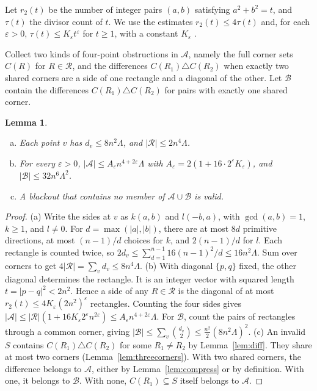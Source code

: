 \documentclass[12pt]{article}
\theoremstyle{plain}
\newtheorem{lemma}[theorem]{Lemma}
\theoremstyle{definition}
\theoremstyle{remark}
\begin{document}
Let $r_2(t)$ be the number of integer pairs $(a,b)$ satisfying
$a^2+b^2=t$, and $\tau(t)$ the divisor count of $t$.
We use the estimates $r_2(t)\le4\tau(t)$ and, for each
$\varepsilon>0$, $\tau(t)\le K_\varepsilon t^\varepsilon$ for $t\ge1$,
with a constant $K_\varepsilon$
\cite[Sections~16.9, 16.10, and~18.1]{hardywright2008}.

Collect two kinds of four-point obstructions in $\mathcal A$,
namely the full corner sets $C(R)$ for $R\in\mathcal R$, and the
differences $C(R_1)\triangle C(R_2)$ when exactly two shared corners
are a side of one rectangle and a diagonal of the other.
Let $\mathcal B$ contain the differences $C(R_1)\triangle C(R_2)$
for pairs with exactly one shared corner.

\begin{lemma}\label{lem:counts}
\leavevmode
\begin{enumerate}[(a)]
\item Each point $v$ has $d_v\le8n^2\Lambda$, and $|\mathcal R|\le2n^4\Lambda$.
\item For every $\varepsilon>0$, $|\mathcal A|\le A_\varepsilon n^{4+2\varepsilon}\Lambda$ with $A_\varepsilon=2(1+16\cdot2^\varepsilon K_\varepsilon)$, and $|\mathcal B|\le32n^6\Lambda^2$.
\item A blackout that contains no member of $\mathcal A\cup\mathcal B$ is valid.
\end{enumerate}
\end{lemma}

\begin{proof}
(a) Write the sides at $v$ as $k(a,b)$ and $l(-b,a)$, with
$\gcd(a,b)=1$, $k\ge1$, and $l\ne0$.
For $d=\max(|a|,|b|)$, there are at most $8d$ primitive directions,
at most $(n-1)/d$ choices for $k$, and $2(n-1)/d$ for $l$.
Each rectangle is counted twice, so
$2d_v\le\sum_{d=1}^{n-1}16(n-1)^2/d\le16n^2\Lambda$.
Sum over corners to get
$4|\mathcal R|=\sum_vd_v\le8n^4\Lambda$.
(b) With diagonal $\{p,q\}$ fixed, the other diagonal determines the
rectangle. It is an integer vector with squared length
$t=|p-q|^2<2n^2$. Hence a side of any $R\in\mathcal R$ is the
diagonal of at most $r_2(t)\le4K_\varepsilon(2n^2)^\varepsilon$
rectangles. Counting the four sides gives
$|\mathcal A|\le|\mathcal R|(1+16K_\varepsilon2^\varepsilon n^{2\varepsilon})\le A_\varepsilon n^{4+2\varepsilon}\Lambda$.
For $\mathcal B$, count the pairs of rectangles through a common
corner, giving
$|\mathcal B|\le\sum_v\binom{d_v}2\le\frac{n^2}2(8n^2\Lambda)^2$.
(c) An invalid $S$ contains $C(R_1)\triangle C(R_2)$ for some
$R_1\ne R_2$ by Lemma~\ref{lem:diff}. They share at most two corners
(Lemma~\ref{lem:threecorners}). With two shared corners, the difference
belongs to $\mathcal A$, either by Lemma~\ref{lem:compress} or by
definition. With one, it belongs to $\mathcal B$. With none,
$C(R_1)\subseteq S$ itself belongs to $\mathcal A$.
\end{proof}
\end{document}
